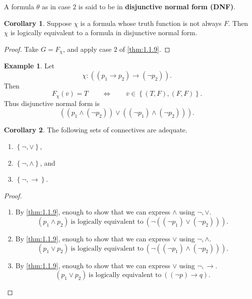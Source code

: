 \documentclass{article}
\newcommand{\rb}[1]{\left( #1 \right)}
\newcommand{\cb}[1]{\left\{ #1 \right\}}
\newcommand{\notb}[1]{\rb{\neg #1}}
\newcommand{\orb}[2]{\rb{#1 \lor #2}}
\newcommand{\andb}[2]{\rb{#1 \land #2}}
\newcommand{\impb}[2]{\rb{#1 \rightarrow #2}}
\theoremstyle{definition}\newtheorem{definition}{Definition}[subsection]
\theoremstyle{definition}\newtheorem{remark1}[definition]{Remark}
\theoremstyle{definition}\newtheorem{example1}[definition]{Example}
\theoremstyle{definition}\newtheorem*{remark2}{Remark}
\theoremstyle{definition}\newtheorem*{example2}{Example}
\theoremstyle{definition}\newtheorem*{note}{Note}
\theoremstyle{definition}\newtheorem*{notation}{Notation}
\newtheorem{corollary}[definition]{Corollary}
\begin{document}
A formula $ \theta $ as in case $ 2 $ is said to be in \textbf{disjunctive normal form (DNF)}.

\begin{corollary}
Suppose $ \chi $ is a formula whose truth function is not always $ F $. Then $ \chi $ is logically equivalent to a formula in disjunctive normal form.
\end{corollary}

\begin{proof}
Take $ G = F_\chi $, and apply case $ 2 $ of \ref{thm:1.1.9}.
\end{proof}

\begin{example2}
Let
$$ \chi : \impb{\impb{p_1}{p_2}}{\notb{p_2}}. $$
Then
$$ F_\chi\rb{\overline{v}} = T \qquad \iff \qquad \overline{v} \in \cb{\rb{T, F}, \rb{F, F}}. $$
Thus disjunctive normal form is
$$ \orb{\andb{p_1}{\notb{p_2}}}{\andb{\notb{p_1}}{\notb{p_2}}}. $$
\end{example2}

\pagebreak

\begin{corollary}
The following sets of connectives are adequate.
\begin{enumerate}
\item $ \cb{\neg, \lor} $,
\item $ \cb{\neg, \land} $, and
\item $ \cb{\neg, \rightarrow} $.
\end{enumerate}
\end{corollary}

\begin{proof}
\hfill
\begin{enumerate}
\item By \ref{thm:1.1.9}, enough to show that we can express $ \land $ using $ \neg, \lor $.
$$ \andb{p_1}{p_2} \ \text{is logically equivalent to} \ \notb{\orb{\notb{p_1}}{\notb{p_2}}}. $$
\item By \ref{thm:1.1.9}, enough to show that we can express $ \lor $ using $ \neg, \land $.
$$ \orb{p_1}{p_2} \ \text{is logically equivalent to} \ \notb{\andb{\notb{p_1}}{\notb{p_2}}}. $$
\item By \ref{thm:1.1.9}, enough to show that we can express $ \lor $ using $ \neg, \rightarrow $.
$$ \orb{p_1}{p_2} \ \text{is logically equivalent to} \ \impb{\notb{p}}{q}. $$
\end{enumerate}
\end{proof}

\end{document}
